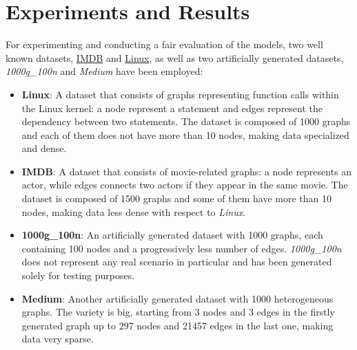 \documentclass[../Thesis.tex]{subfiles}
\begin{document}
	\section{Experiments and Results}
	\label{sec:experiments_results}
	
	For experimenting and conducting a fair evaluation of the models, two well known datasets, \href{https://paperswithcode.com/dataset/imdb-multi}{IMDB} and \href{https://paperswithcode.com/dataset/linux}{Linux}, as well as two artificially generated datasets, \emph{1000g\_100n} and \emph{Medium} have been employed:
	
	\begin{itemize}
		\item \textbf{Linux}: A dataset that consists of graphs representing function calls within the Linux kernel: a node represent a statement and edges represent the dependency between two statements. The dataset is composed of 1000 graphs and each of them does not have more than 10 nodes, making data specialized and dense.
		\item \textbf{IMDB}: A dataset that consists of movie-related graphs: a node represents an actor, while edges connects two actors if they appear in the same movie. The dataset is composed of 1500 graphs and some of them have more than 10 nodes, making data less dense with respect to \emph{Linux}.
		\item \textbf{1000g\_100n}: An artificially generated dataset with 1000 graphs, each containing 100 nodes and a progressively less number of edges. \emph{1000g\_100n} does not represent any real scenario in particular and has been generated solely for testing purposes.
		\item \textbf{Medium}: Another artificially generated dataset with 1000 heterogeneous graphs. The variety is big, starting from 3 nodes and 3 edges in the firstly generated graph up to 297 nodes and 21457 edges in the last one, making data very sparse.
	\end{itemize}
	
\end{document}
